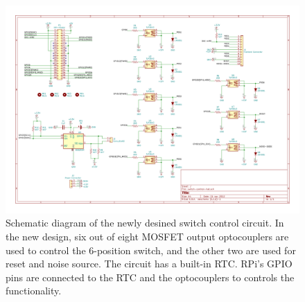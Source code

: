 \begin{figure}
	\centering
	\includegraphics[width=\linewidth]{"Figures/new control"}
	\caption{Schematic diagram of the newly desined switch control circuit. In the new design, six out of eight MOSFET output optocouplers are used to control the 6-position switch, and the other two are used for reset and noise source. The circuit has a built-in RTC. RPi's GPIO pins are connected to the RTC and the optocouplers to controls the functionality.}
	\label{Fig:newcontrol}
\end{figure}


